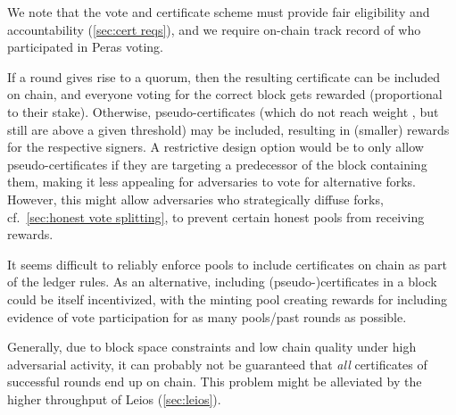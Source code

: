 We note that the vote and certificate scheme must provide fair eligibility and accountability (\cref{sec:cert reqs}), and we require on-chain track record of who participated in Peras voting.

If a round gives rise to a quorum, then the resulting certificate can be included on chain, and everyone voting for the correct block gets rewarded (proportional to their stake).
Otherwise, pseudo-certificates (which do not reach weight \perasQuorum{}, but still are above a given threshold) may be included, resulting in (smaller) rewards for the respective signers.
A restrictive design option would be to only allow pseudo-certificates if they are targeting a predecessor of the block containing them, making it less appealing for adversaries to vote for alternative forks.
However, this might allow adversaries who strategically diffuse forks, cf.\ \cref{sec:honest vote splitting}, to prevent certain honest pools from receiving rewards.

It seems difficult to reliably enforce pools to include certificates on chain as part of the ledger rules.
As an alternative, including (pseudo-)certificates in a block could be itself incentivized, with the minting pool creating rewards for including evidence of vote participation for as many pools/past rounds as possible.

Generally, due to block space constraints and low chain quality under high adversarial activity, it can probably not be guaranteed that \emph{all} certificates of successful rounds end up on chain.
This problem might be alleviated by the higher throughput of Leios (\cref{sec:leios}).

